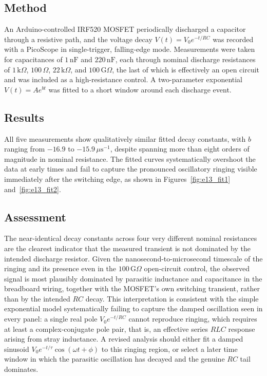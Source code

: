 \documentclass[a4paper, 10pt]{article}
\newcommand{\nF}{\si{\nano\farad}}
\begin{document}
\subsection{Method}

An Arduino-controlled IRF520 MOSFET periodically discharged a capacitor
through a resistive path, and the voltage decay $V(t) = V_0 e^{-t/RC}$ was
recorded with a PicoScope in single-trigger, falling-edge mode. Measurements
were taken for capacitances of $1\,\nF$ and $220\,\nF$, each
through nominal discharge resistances of $1\,\text{k}\Omega$, $100\,\Omega$,
$22\,\text{k}\Omega$, and $100\,\text{G}\Omega$, the last of which is
effectively an open circuit and was included as a high-resistance control.
A two-parameter exponential $V(t) = A e^{bt}$ was fitted to a short window
around each discharge event.

\subsection{Results}

All five measurements show qualitatively similar fitted decay constants,
with $b$ ranging from $-16.9$ to $-15.9\,\mu\text{s}^{-1}$, despite spanning
more than eight orders of magnitude in nominal resistance. The fitted
curves systematically overshoot the data at early times and fail to capture
the pronounced oscillatory ringing visible immediately after the switching
edge, as shown in Figures~\ref{fig:e13_fit1} and~\ref{fig:e13_fit2}.

\subsection{Assessment}

The near-identical decay constants across four very different nominal
resistances are the clearest indicator that the measured transient is not
dominated by the intended discharge resistor. Given the
nanosecond-to-microsecond timescale of the ringing and its presence even in
the $100\,\text{G}\Omega$ open-circuit control, the observed signal is most
plausibly dominated by parasitic inductance and capacitance in the
breadboard wiring, together with the MOSFET's own switching transient,
rather than by the intended $RC$ decay. This interpretation is consistent
with the simple exponential model systematically failing to capture the
damped oscillation seen in every panel: a single real pole
$V_0 e^{-t/RC}$ cannot reproduce ringing, which requires at least a
complex-conjugate pole pair, that is, an effective series $RLC$ response
arising from stray inductance. A revised analysis should either fit a
damped sinusoid $V_0 e^{-t/\tau}\cos(\omega t + \phi)$ to this ringing
region, or select a later time window in which the parasitic oscillation
has decayed and the genuine $RC$ tail dominates.
\end{document}
